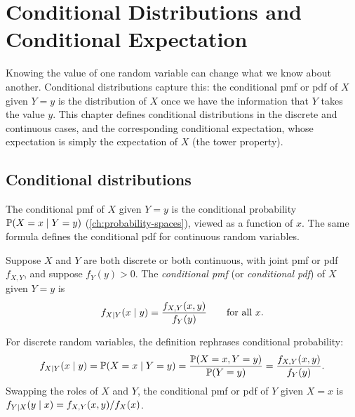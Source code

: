 \chapter{Conditional Distributions and Conditional Expectation}\label{ch:conditional-expectation}


Knowing the value of one random variable can change what we know about another. Conditional distributions capture this: the conditional pmf or pdf of $X$ given $Y = y$ is the distribution of $X$ once we have the information that $Y$ takes the value $y$. This chapter defines conditional distributions in the discrete and continuous cases, and the corresponding conditional expectation, whose expectation is simply the expectation of $X$ (the tower property).

\section{Conditional distributions}\label{sec:conditional-distributions}

The conditional pmf of $X$ given $Y = y$ is the conditional probability $\mathbb{P}(X = x \mid Y = y)$ (\cref{ch:probability-spaces}), viewed as a function of $x$. The same formula defines the conditional pdf for continuous random variables.

\begin{definition}\label{def:conditional-pmf-pdf}
Suppose $X$ and $Y$ are both discrete or both continuous, with joint pmf or pdf $f_{X,Y}$, and suppose $f_Y(y) > 0$. The \emph{conditional pmf} (or \emph{conditional pdf}) of $X$ given $Y = y$ is
\[
  f_{X \mid Y}(x \mid y) = \frac{f_{X,Y}(x, y)}{f_Y(y)} \qquad \text{for all } x.
\]
\end{definition}

For discrete random variables, the definition rephrases conditional probability:
\[
  f_{X \mid Y}(x \mid y) = \mathbb{P}(X = x \mid Y = y) = \frac{\mathbb{P}(X = x, Y = y)}{\mathbb{P}(Y = y)} = \frac{f_{X,Y}(x, y)}{f_Y(y)}.
\]
Swapping the roles of $X$ and $Y$, the conditional pmf or pdf of $Y$ given $X = x$ is $f_{Y \mid X}(y \mid x) = f_{X,Y}(x, y) / f_X(x)$.

